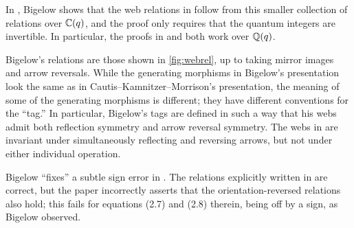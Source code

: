 In \cite[Proposition 1]{Bigelow}, Bigelow shows that the web relations in \cite{CKM} follow from this smaller collection of relations over $\mathbb{C}(q)$, and the proof only requires that the quantum integers are invertible. In particular, the proofs in \cite{CKM} and \cite{Bigelow} both work over $\mathbb{Q}(q)$.

Bigelow's relations are those shown in \cref{fig:webrel}, up to taking mirror images and arrow reversals. While the generating morphisms in Bigelow's presentation look the same as in Cautis--Kamnitzer--Morrison's presentation, the meaning of some of the generating morphisms is different; they have different conventions for the ``tag.'' In particular, Bigelow's tags are defined in such a way that his webs admit both reflection symmetry and arrow reversal symmetry. The webs in \cite{CKM} are invariant under simultaneously reflecting and reversing arrows, but not under either individual operation.

\begin{remark} Bigelow ``fixes'' a subtle sign error in \cite{CKM}. The relations explicitly written in \cite{CKM} are correct, but the paper incorrectly asserts that the orientation-reversed relations also hold; this fails for equations (2.7) and (2.8) therein, being off by a sign, as Bigelow observed.  \end{remark}

